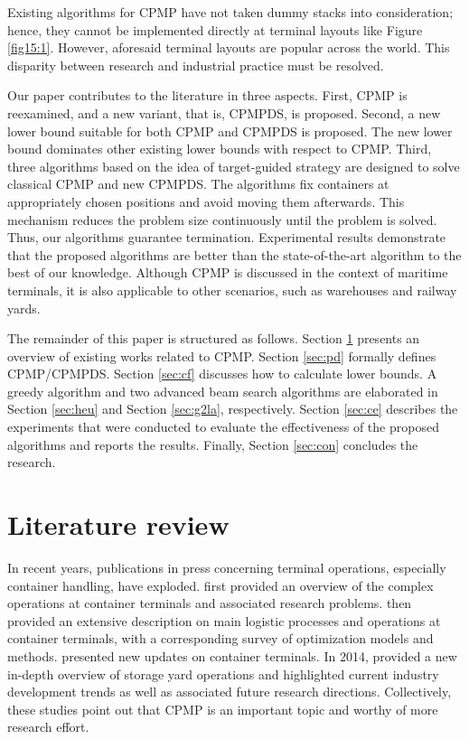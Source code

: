 \documentclass[review,3p,times,authoryear,12pt]{elsarticle}
\begin{document}
Existing algorithms for CPMP have not taken dummy stacks into consideration; hence, they cannot be implemented directly at terminal layouts like Figure \ref{fig15:1}. However, aforesaid terminal layouts are popular across the world. This disparity between research and industrial practice must be resolved.

Our paper contributes to the literature in three aspects. First, CPMP is reexamined, and a new variant, that is, CPMPDS, is proposed. Second, a new lower bound suitable for both CPMP and CPMPDS is proposed. The new lower bound dominates other existing lower bounds with respect to CPMP. Third, three algorithms based on the idea of target-guided strategy are designed to solve classical CPMP and new CPMPDS. The algorithms fix containers at appropriately chosen positions and avoid moving them afterwards. This mechanism reduces the problem size continuously until the problem is solved. Thus, our algorithms guarantee termination. Experimental results demonstrate that the proposed algorithms are better than the state-of-the-art algorithm to the best of our knowledge. Although CPMP is discussed in the context of maritime terminals, it is also applicable to other scenarios, such as warehouses and railway yards.

The remainder of this paper is structured as follows. Section \ref{sec:litreview} presents an overview of existing works related to CPMP. Section \ref{sec:pd} formally defines CPMP/CPMPDS. Section \ref{sec:cf} discusses how to calculate lower bounds. A greedy algorithm and two advanced beam search algorithms are elaborated in Section \ref{sec:heu} and Section \ref{sec:g2la}, respectively. Section \ref{sec:ce} describes the experiments that were conducted to evaluate the effectiveness of the proposed algorithms and reports the results. Finally, Section \ref{sec:con} concludes the research.

\section{Literature review}
\label{sec:litreview}

In recent years, publications in press concerning terminal operations, especially container handling, have exploded. \cite{Vis2003} first provided an overview of the complex operations at container terminals and associated research problems.
\cite{Steenken2004} then provided an extensive description on main logistic processes and operations at container terminals, with a corresponding survey of optimization models and methods. \cite{Stahlbock2008} presented new updates on container terminals.
In 2014, \cite{Carlo2014} provided a new in-depth overview of storage yard operations and highlighted current industry development trends as well as associated future research directions.
Collectively, these studies point out that CPMP is an important topic and worthy of more research effort.
\end{document}
